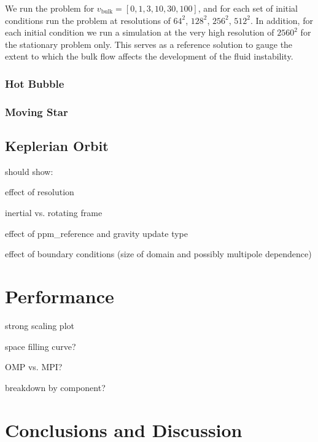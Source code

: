 \documentclass[12pt,preprint]{aastex}
\begin{document}
We run the problem for $v_\text{bulk} = [0, 1, 3, 10, 30, 100]$, and for each set of initial conditions run the problem at resolutions of $64^2$, $128^2$, $256^2$, $512^2$. In addition, for each initial condition we run a simulation at the very high resolution of $2560^2$ for the stationary problem only. This serves as a reference solution to gauge the extent to which the bulk flow affects the development of the fluid instability.

\subsubsection{Hot Bubble}\label{sec:hot_bubble}

\subsubsection{Moving Star}\label{sed:moving_star}

\subsection{Keplerian Orbit}\label{sec:kepler}

should show:

effect of resolution

inertial vs. rotating frame

effect of ppm\_reference and gravity update type

effect of boundary conditions (size of domain and possibly multipole dependence)


\section{Performance}\label{sec:Performance}

strong scaling plot

space filling curve?

OMP vs. MPI?

breakdown by component?


\section{Conclusions and Discussion}\label{sec:Conclusions and Discussion}
\end{document}
